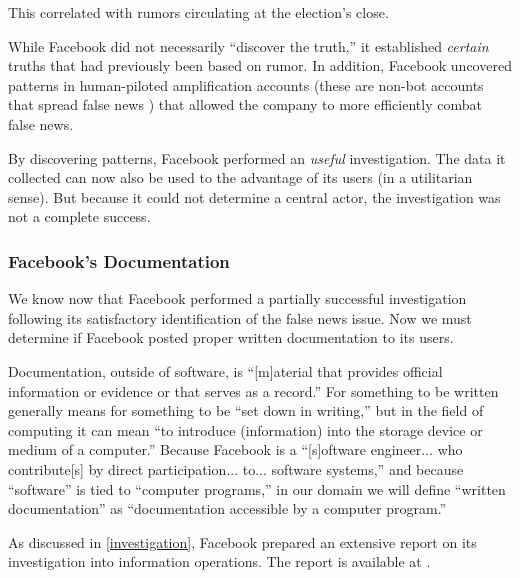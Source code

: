 \par This correlated with rumors circulating at the election's close. \cite{wp_russia,stanford_election} 

\par While Facebook did not necessarily ``discover the truth,'' it established \emph{certain} truths that had previously been based on rumor. \cite{cnn_fight} In addition, Facebook uncovered patterns in human-piloted amplification accounts (these are non-bot accounts that spread false news \cite{fb_info_ops}) that allowed the company to more efficiently combat false news.

\par By discovering patterns, Facebook performed an \emph{useful} investigation. The data it collected can now also be used to the advantage of its users (in a utilitarian sense). But because it could not determine a central actor, \cite{fb_info_ops} the investigation was not a complete success.

\subsubsection{Facebook's Documentation}

\par We know now that Facebook performed a partially successful investigation following its satisfactory identification of the false news issue. Now we must determine if Facebook posted proper written documentation to its users.

\par Documentation, outside of software, is ``[m]aterial that provides official information or evidence or that serves as a record.'' \cite{oxford} For something to be written generally means for something to be ``set down in writing,'' \cite{merriam_webster} but in the field of computing it can mean ``to introduce (information) into the storage device or medium of a computer.'' \cite{merriam_webster} Because Facebook is a ``[s]oftware engineer... who contribute[s] by direct participation... to... software systems,'' \cite{se_code} and because ``software'' is tied to ``computer programs,'' \cite{merriam_webster} in our domain we will define ``written documentation'' as ``documentation accessible by a computer program.''


\par As discussed in \ref{investigation}, Facebook prepared an extensive report on its investigation into information operations. The report is available at \cite{fb_info_ops}. 

